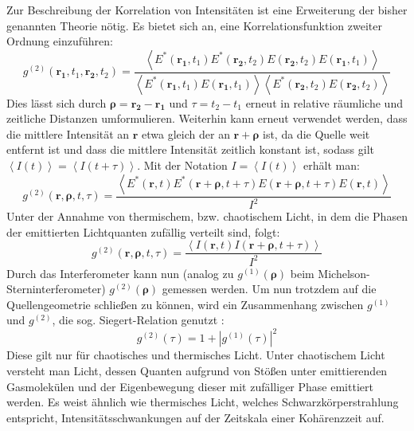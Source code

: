 Zur Beschreibung der Korrelation von Intensitäten ist eine Erweiterung der bisher genannten Theorie nötig. 
Es bietet sich an, eine Korrelationsfunktion zweiter Ordnung einzuführen:
\begin{equation}
    g^{(2)}(\mathbf{r_1}, t_1, \mathbf{r_2}, t_2) = \frac{\left<E^*(\mathbf{r_1}, t_1)E^*(\mathbf{r_2}, t_2)E(\mathbf{r_2}, t_2)E(\mathbf{r_1}, t_1)\right>}{\left<E^*(\mathbf{r_1}, t_1)E(\mathbf{r_1}, t_1)\right> \left<E^*(\mathbf{r_2}, t_2)E(\mathbf{r_2}, t_2)\right> }
\end{equation}
Dies lässt sich durch $\bm{\rho} = \mathbf{r_2} - \mathbf{r_1}$ und $\tau = t_2 - t_1$ erneut in relative räumliche und zeitliche Distanzen umformulieren. Weiterhin kann erneut verwendet werden, dass die mittlere Intensität an $\mathbf{r}$ etwa gleich der an $\mathbf{r} +\bm{\rho}$ ist, da die  Quelle weit entfernt ist und dass die mittlere Intensität zeitlich konstant ist, sodass gilt $\left<I(t)\right> = \left<I(t+\tau)\right>$. Mit der Notation $I=\left<I(t)\right>$ erhält man:
\begin{equation}
    g^{(2)}(\mathbf{r}, \bm{\rho}, t, \tau) = \frac{\left<E^*(\mathbf{r}, t)E^*(\mathbf{r+\rho}, t+\tau)E(\mathbf{r+\rho}, t+\tau)E(\mathbf{r}, t)\right>}{I^2}
\end{equation}
Unter der Annahme von thermischem, bzw. chaotischem Licht, in dem die Phasen der emittierten Lichtquanten zufällig verteilt sind, folgt:
\begin{equation}
    g^{(2)}(\mathbf{r}, \bm{\rho}, t, \tau) =  \frac{\left<I(\mathbf{r}, t) I(\mathbf{r}+\bm{\rho}, t+\tau)\right>}{I^2}
\end{equation}
Durch das Interferometer kann nun (analog zu $g^{(1)}(\bm{\rho})$ beim Michelson-Sterninterferometer) $g^{(2)}(\bm{\rho})$ gemessen werden. 
Um nun trotzdem auf die Quellengeometrie schließen zu können, wird ein Zusammenhang zwischen $g^{(1)}$ und $g^{(2)}$, die sog. Siegert-Relation genutzt \cite{lasseguesFieldIntensityCorrelations2022}:
\begin{equation}
    g^{(2)}(\tau) = 1+ \left|g^{(1)}(\tau)\right|^2
\end{equation}
Diese gilt nur für chaotisches und thermisches Licht. 
Unter chaotischem Licht versteht man Licht, dessen Quanten aufgrund von Stößen unter emittierenden Gasmolekülen und der Eigenbewegung dieser mit zufälliger Phase emittiert werden. 
Es weist ähnlich wie thermisches Licht, welches Schwarzkörperstrahlung entspricht, Intensitätsschwankungen auf der Zeitskala einer Kohärenzzeit auf. 
